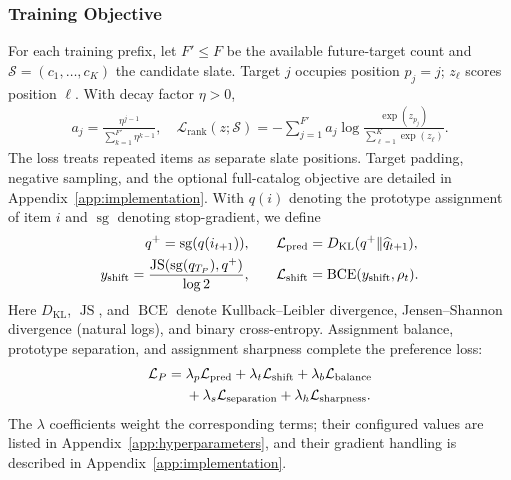 ﻿\documentclass[sigconf,anonymous,review]{acmart}
\newcommand{\sg}{\operatorname{sg}}
\begin{document}
\subsubsection{Training Objective}
For each training prefix, let $F'\leq F$ be the available future-target count and $\mathcal S=(c_1,\ldots,c_K)$ the candidate slate. Target $j$ occupies position $p_j=j$; $z_\ell$ scores position $\ell$. With decay factor $\eta>0$,
\begin{align}
 a_j=\frac{\eta^{j-1}}{\sum_{k=1}^{F'}\eta^{k-1}}, \quad
 \mathcal L_{\mathrm{rank}}(z;\mathcal S)
 =-\sum_{j=1}^{F'}a_j\log
 \frac{\exp(z_{p_j})}{\sum_{\ell=1}^{K}\exp(z_\ell)}.
\end{align}
The loss treats repeated items as separate slate positions. Target padding, negative sampling, and the optional full-catalog objective are detailed in Appendix~\ref{app:implementation}.
With $q(i)$ denoting the prototype assignment of item $i$ and $\sg$ denoting stop-gradient, we define
\begin{align}
 q^+=\sg(q(i_{t+1})), \qquad &
 \mathcal L_{\mathrm{pred}}=D_{\mathrm{KL}}(q^+\Vert\widehat q_{t+1}),\notag\\
 y_{\mathrm{shift}}=\frac{\operatorname{JS}(\sg(q_{T_P}),q^+)}{\log 2},\qquad &
 \mathcal L_{\mathrm{shift}}=\operatorname{BCE}(y_{\mathrm{shift}},\rho_t).
\end{align}
Here $D_{\mathrm{KL}}$, $\operatorname{JS}$, and $\operatorname{BCE}$ denote Kullback--Leibler divergence, Jensen--Shannon divergence (natural logs), and binary cross-entropy. Assignment balance, prototype separation, and assignment sharpness complete the preference loss:
\begin{align}
 \mathcal L_P={}&\lambda_p\mathcal L_{\mathrm{pred}}
 +\lambda_t\mathcal L_{\mathrm{shift}}
 +\lambda_b\mathcal L_{\mathrm{balance}}\notag\\
 &+\lambda_s\mathcal L_{\mathrm{separation}}
 +\lambda_h\mathcal L_{\mathrm{sharpness}}.
\end{align}
The $\lambda$ coefficients weight the corresponding terms; their configured values are listed in Appendix~\ref{app:hyperparameters}, and their gradient handling is described in Appendix~\ref{app:implementation}.
\end{document}
